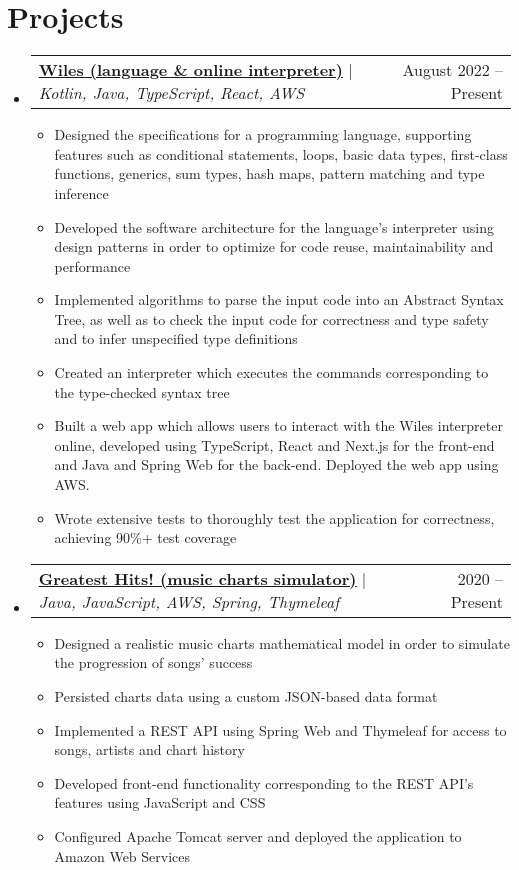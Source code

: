 \documentclass[letterpaper,11pt]{article}
\makeatletter
\newcommand{\resumeItem}[1]{
  \item\small{
    {#1 \vspace{-2pt}}
  }
}
\newcommand{\resumeProjectHeading}[2]{
    \item
    \begin{tabular*}{0.97\textwidth}{l@{\extracolsep{\fill}}r}
      \small#1 & #2 \\
    \end{tabular*}\vspace{-7pt}
}
\newcommand{\resumeSubHeadingListStart}{\begin{itemize}[leftmargin=0.15in, label={}]}
\newcommand{\resumeSubHeadingListEnd}{\end{itemize}}
\newcommand{\resumeItemListStart}{\begin{itemize}}
\newcommand{\resumeItemListEnd}{\end{itemize}\vspace{-5pt}}
\makeatother
\begin{document}
\section{Projects}
    \resumeSubHeadingListStart
      \resumeProjectHeading
          {\textbf{\href{https://wiles.costea.in/}{\underline{Wiles (language \& online interpreter)}}} $|$ \emph{Kotlin, Java, TypeScript, React, AWS}}{August 2022 -- Present}
          \resumeItemListStart
            \resumeItem{Designed the specifications for a programming language, supporting features such as conditional statements, loops, basic data types, first-class functions, generics, sum types, hash maps, pattern matching and type inference}
            \resumeItem{Developed the software architecture for the language's interpreter using design patterns in order to optimize for code reuse, maintainability and performance}
            \resumeItem{Implemented algorithms to parse the input code into an Abstract Syntax Tree, as well as to check the input code for correctness and type safety and to infer unspecified type definitions}
            \resumeItem{Created an interpreter which executes the commands corresponding to the type-checked syntax tree}
            \resumeItem{Built a web app which allows users to interact with the Wiles interpreter online, developed using TypeScript, React and Next.js for the front-end and Java and Spring Web for the back-end. Deployed the web app using AWS.}
            \resumeItem{Wrote extensive tests to thoroughly test the application for correctness, achieving 90\%+ test coverage}

          \resumeItemListEnd
      \resumeProjectHeading
          {\textbf{{\href{https://greatest-hits.costea.in/}{\underline{Greatest Hits! (music charts simulator)}}}} $|$ \emph{Java, JavaScript, AWS, Spring, Thymeleaf}}{2020 -- Present}
          \resumeItemListStart
            \resumeItem{Designed a realistic music charts mathematical model in order to simulate the progression of songs' success}
            \resumeItem{Persisted charts data using a custom JSON-based data format}
            \resumeItem{Implemented a REST API using Spring Web and Thymeleaf for access to songs, artists and chart history}
            \resumeItem{Developed front-end functionality corresponding to the REST API's features using JavaScript and CSS}
            \resumeItem{Configured Apache Tomcat server and deployed the application to Amazon Web Services}
          \resumeItemListEnd
          
    \resumeSubHeadingListEnd
\end{document}
